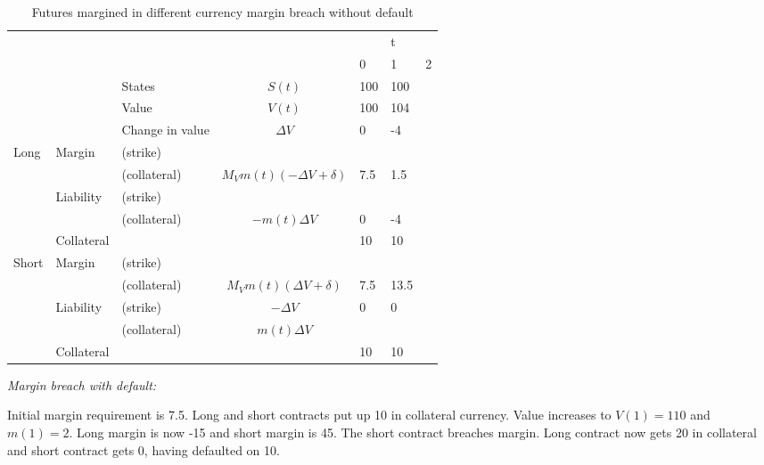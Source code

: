 \documentclass[12pt]{article}
\begin{document}
\begin{table}
\begin{tabular}{lll|c|lll}
&  &  &  &  & t &\\  
&  &  &  & 0 & 1 & 2\\
\hline
\hline
&  & States &  $S(t)$ & 100 & 100 & \\
&  & Value  &  $V(t)$  & 100 & 104 &  \\
&  & Change in value & $\Delta V$ & 0& -4 &  \\
\hline
Long      & Margin    & (strike)     &  &  &  &  \\
          &           & (collateral) & $M_V m(t)(-\Delta V + \delta)$ & 7.5 & 1.5 &\\ 
          & Liability & (strike)     &  &  &  & \\ 
          &           & (collateral)&$-m(t) \Delta V$ & 0  & -4 &\\
          & Collateral&                       &    & 10 & 10 & \\
\hline
Short     & Margin    & (strike)     &   &  &  & \\
          &           & (collateral) & $M_V m(t)(\Delta V + \delta)$& 7.5 & 13.5 &\\
          & Liability & (strike)     & $-\Delta V$ & 0 & 0 & \\
          &           & (collateral) & $m(t)\Delta V$ & & &\\
          & Collateral&                       &    & 10 & 10 & \\ 
\hline          

\end{tabular}
\caption{Futures margined in different currency margin breach without default}
\label{fut}
\end{table}




\textit{Margin breach with default:}

Initial margin requirement is 7.5. Long and short contracts put up 10 in collateral currency. Value increases to $V(1) = 110$ and $m(1)=2$. Long margin is now -15 and short margin is 45.  The short contract breaches margin. Long contract now gets 20 in collateral and short contract gets 0, having defaulted on 10.
\end{document}
